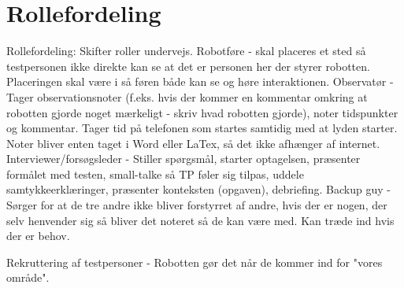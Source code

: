 \section{Rollefordeling}
\label{ParametreRollefordeling}
%
Rollefordeling: Skifter roller undervejs.
Robotføre - skal placeres et sted så testpersonen ikke direkte kan se at det er personen her der styrer robotten. Placeringen skal være i så føren både kan se og høre interaktionen. 
Observatør - Tager observationsnoter (f.eks. hvis der kommer en kommentar omkring at robotten gjorde noget mærkeligt - skriv hvad robotten gjorde), noter tidspunkter og kommentar. Tager tid på telefonen som startes samtidig med at lyden starter. Noter bliver enten taget i Word eller LaTex, så det ikke afhænger af internet.
Interviewer/forsøgsleder - Stiller spørgsmål, starter optagelsen, præsenter formålet med testen, small-talke så TP føler sig tilpas, uddele samtykkeerklæringer, præsenter konteksten (opgaven), debriefing.
Backup guy - Sørger for at de tre andre ikke bliver forstyrret af andre, hvis der er nogen, der selv henvender sig så bliver det noteret så de kan være med. Kan træde ind hvis der er behov.   

Rekruttering af testpersoner - Robotten gør det når de kommer ind for "vores område".